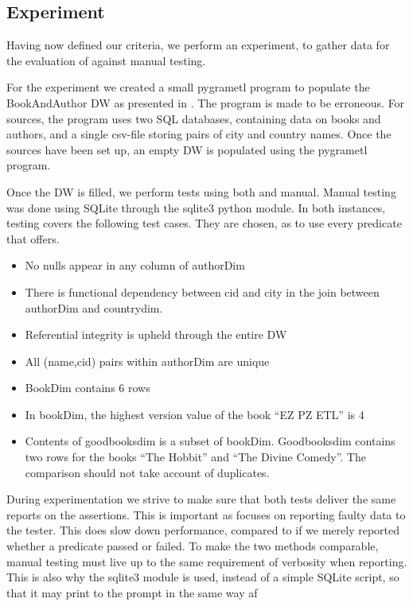 \subsection{Experiment}
Having now defined our criteria, we perform an experiment, to gather data for the evaluation of \FW{} against manual testing.

For the experiment we created a small pygrametl program to populate the BookAndAuthor DW as presented in . The program is made to be erroneous. For sources, the program uses two SQL databases, containing data on books and authors, and a single csv-file storing pairs of city and country names.  Once the sources have been set up, an empty DW is populated using the pygrametl program.

Once the DW is filled, we perform tests using both \FW{} and manual.  Manual testing was done using SQLite through the sqlite3 python module. In both instances, testing covers the following test cases. They are chosen, as to use every predicate that \FW{} offers.

\begin{itemize}
\item No nulls appear in any column of authorDim
\item There is functional dependency between cid and city in the join between authorDim and countrydim.
\item Referential integrity is upheld through the entire DW
\item All (name,cid) pairs within authorDim are unique
\item BookDim contains 6 rows
\item In bookDim, the highest version value of the book “EZ PZ ETL” is 4
\item Contents of goodbooksdim is a subset of bookDim. Goodbooksdim contains two rows for the books “The Hobbit” and “The Divine Comedy”. The comparison should not take account of duplicates.
\end{itemize}

During experimentation we strive to make sure that both tests deliver the same reports on the assertions.  This is important as \FW{} focuses on reporting faulty data to the tester. This does slow down performance, compared to if we merely reported whether a predicate passed or failed. To make the two methods comparable, manual testing must live up to the same requirement of verbosity when reporting. This is also why the sqlite3 module is used, instead of a simple SQLite script, so that it may print to the prompt in the same way af \FW{}

